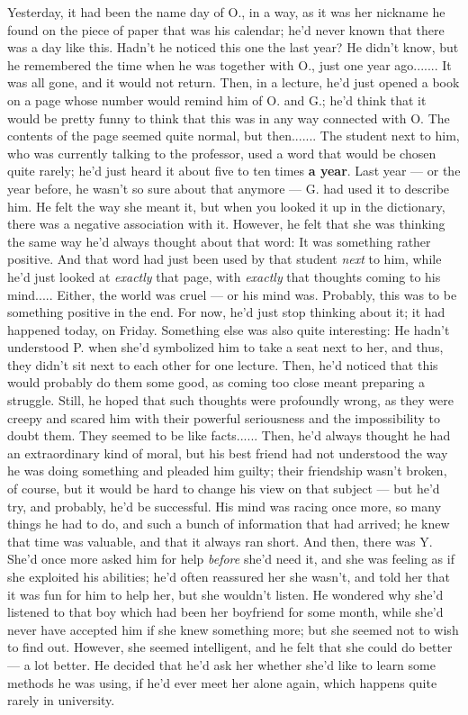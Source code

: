 Yesterday, it had been the name day of O., in a way, as it was her nickname he found on the piece of paper that was his calendar; he'd never known that there was a day like this. Hadn't he noticed this one the last year? He didn't know, but he remembered the time when he was together with O., just one year ago.......
It was all gone, and it would not return. Then, in a lecture, he'd just opened a book on a page whose number would remind him of O. and G.; he'd think that it would be pretty funny to think that this was in any way connected with O. The contents of the page seemed quite normal, but then.......
The student next to him, who was currently talking to the professor, used a word that would be chosen quite rarely; he'd just heard it about five to ten times \textbf{a year}. Last year --- or the year before, he wasn't so sure about that anymore --- G. had used it to describe him. 
He felt the way she meant it, but when you looked it up in the dictionary, there was a negative association with it. However, he felt that she was thinking the same way he'd always thought about that word: It was something rather positive. And that word had just been used by that student \emph{next} to him, while he'd just looked at \emph{exactly} that page, with \emph{exactly} that thoughts coming to his mind.....
Either, the world was cruel --- or his mind was. Probably, this was to be something positive in the end. For now, he'd just stop thinking about it; it had happened today, on Friday. 
Something else was also quite interesting: He hadn't understood P. when she'd symbolized him to take a seat next to her, and thus, they didn't sit next to each other for one lecture. Then, he'd noticed that this would probably do them some good, as coming too close meant preparing a struggle. Still, he hoped that such thoughts were profoundly wrong, as they were creepy and scared him with their powerful seriousness and the impossibility to doubt them. They seemed to be like facts......
Then, he'd always thought he had an extraordinary kind of moral, but his best friend had not understood the way he was doing something and pleaded him guilty; their friendship wasn't broken, of course, but it would be hard to change his view on that subject --- but he'd try, and probably, he'd be successful. 
His mind was racing once more, so many things he had to do, and such a bunch of information that had arrived; he knew that time was valuable, and that it always ran short. 
And then, there was Y. She'd once more asked him for help \emph{before} she'd need it, and she was feeling as if she exploited his abilities; he'd often reassured her she wasn't, and told her that it was fun for him to help her, but she wouldn't listen. He wondered why she'd listened to that boy which had been her boyfriend for some month, while she'd never have accepted him if she knew something more; but she seemed not to wish to find out. However, she seemed intelligent, and he felt that she could do better --- a lot better. He decided that he'd ask her whether she'd like to learn some methods he was using, if he'd ever meet her alone again, which happens quite rarely in university. 
